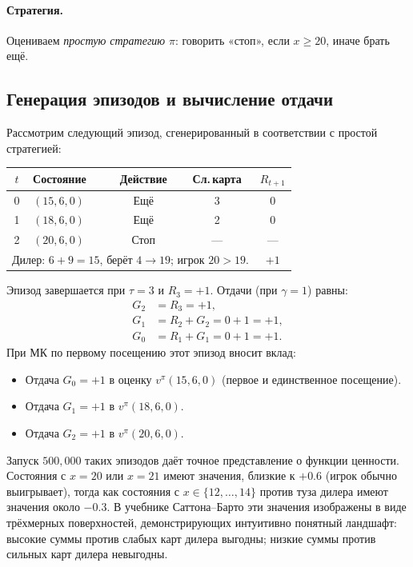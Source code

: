 \paragraph{Стратегия.}  Оцениваем \emph{простую стратегию} $\pi$: говорить «стоп», если $x \ge 20$, иначе брать ещё.

\subsection*{Генерация эпизодов и вычисление отдачи}

\begin{example}
\label{ex:blackjack-episode}
Рассмотрим следующий эпизод, сгенерированный в соответствии с простой стратегией:
\begin{center}
\small
\begin{tabular}{@{}clccc@{}}
\toprule
$t$ & Состояние & Действие & Сл.\,карта & $R_{t+1}$ \\
\midrule
0 & $(15, 6, 0)$ & Ещё  & 3  & 0 \\
1 & $(18, 6, 0)$ & Ещё  & 2  & 0 \\
2 & $(20, 6, 0)$ & Стоп & ---  & --- \\
\multicolumn{4}{l}{Дилер: $6 + 9 = 15$, берёт $4 \to 19$; игрок $20 > 19$.} & $+1$ \\
\bottomrule
\end{tabular}
\end{center}
Эпизод завершается при $\tau = 3$ и $R_3 = +1$.  Отдачи (при $\gamma=1$) равны:
\begin{align*}
  G_2 &= R_3 = +1, \\
  G_1 &= R_2 + G_2 = 0 + 1 = +1, \\
  G_0 &= R_1 + G_1 = 0 + 1 = +1.
\end{align*}
При МК по первому посещению этот эпизод вносит вклад:
\begin{itemize}[leftmargin=*]
  \item Отдача $G_0 = +1$ в оценку $v^\pi(15, 6, 0)$ (первое и единственное посещение).
  \item Отдача $G_1 = +1$ в $v^\pi(18, 6, 0)$.
  \item Отдача $G_2 = +1$ в $v^\pi(20, 6, 0)$.
\end{itemize}
\end{example}

Запуск $500{,}000$ таких эпизодов даёт точное представление о функции ценности.  Состояния с $x = 20$ или $x = 21$ имеют значения, близкие к $+0.6$ (игрок обычно выигрывает), тогда как состояния с $x \in \{12, \dots, 14\}$ против туза дилера имеют значения около $-0.3$.  В учебнике Саттона--Барто эти значения изображены в виде трёхмерных поверхностей, демонстрирующих интуитивно понятный ландшафт: высокие суммы против слабых карт дилера выгодны; низкие суммы против сильных карт дилера невыгодны.

